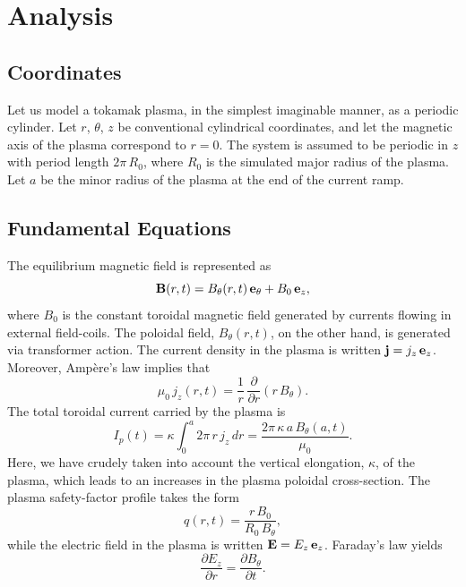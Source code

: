 \documentclass[12pt,prb,aps]{revtex4-1}
\begin{document}
\section{Analysis}
\subsection{Coordinates}
Let us model a tokamak plasma, in the simplest imaginable manner, as a periodic cylinder. Let $r$, $\theta$, $z$ be conventional cylindrical coordinates, and
let the magnetic axis of the plasma correspond to $r=0$. The system is assumed to be periodic in $z$ with period length $2\pi\,R_0$, where $R_0$ is the
simulated major radius of the plasma. Let $a$ be the minor radius of the plasma at the end of the current ramp. 

\subsection{Fundamental Equations}
The equilibrium magnetic field is represented as
\begin{equation}
{\bf B}(r,t) = B_\theta(r,t)\,{\bf e}_\theta+ B_0\,{\bf e}_z,
\end{equation}
where $B_0$ is the constant toroidal magnetic field generated by  currents flowing in external  field-coils. The poloidal field, $B_\theta(r,t)$, on the other hand, is generated
via transformer action. The current density in the plasma is written ${\bf j}= j_z\,{\bf e}_z$. Moreover, Amp\`{e}re's law implies that
\begin{equation}
\mu_0\,j_z(r,t) = \frac{1}{r}\,\frac{\partial}{\partial r}(r\,B_\theta).
\end{equation}
The total toroidal current carried by the plasma is
\begin{equation}
I_p(t)= \kappa\int_0^a 2\pi\,r\,j_z\,dr = \frac{2\pi\,\kappa\,a\,B_\theta(a,t)}{\mu_0}.
\end{equation}
Here, we have crudely taken into account the vertical elongation, $\kappa$, of the plasma, which leads to an increases in the plasma poloidal cross-section. 
The plasma safety-factor profile takes the form 
\begin{equation}
q(r,t) = \frac{r\,B_0}{R_0\,B_\theta},
\end{equation}
while the electric field in the plasma is written ${\bf E}= E_z\,{\bf e}_z$. Faraday's law yields
\begin{equation}
\frac{\partial E_z}{\partial r} = \frac{\partial B_\theta}{\partial t}.
\end{equation}
\end{document}
